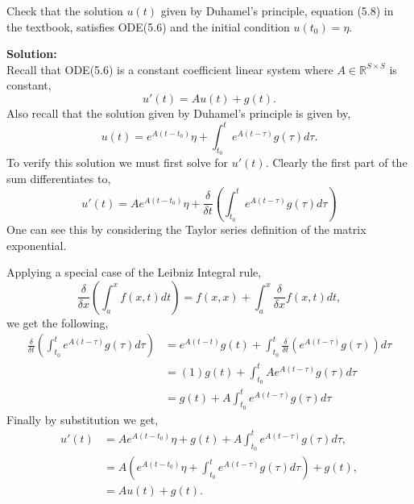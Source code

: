\documentclass[12pt]{article}
\makeatletter
\theoremstyle{homework}
\newenvironment{exercise}[1]
{\def\@currentlabel{#1}\exercisecore}
{\endexercisecore}
\newcommand{\localhead}[1]{\par\smallskip\noindent\textbf{#1}\nobreak\\}%
\newcommand\solution{\localhead{Solution:}}
\newcommand{\Reals}{\ensuremath{\mathbb R}}
\let\RR\Reals
\makeatother
\begin{document}
\vspace{1in}




\begin{exercise}{Problem P24} Check that the solution $u(t)$ given by Duhamel's principle, equation (5.8)
  in the textbook, satisfies ODE(5.6) and the initial condition $u(t_0) = \eta$.
  \solution Recall that ODE(5.6) is a constant coefficient linear system where $A \in \RR^{S \times S}$ 
 is constant,  
  \begin{equation*}
    u'(t) = Au(t) + g(t).
  \end{equation*} 
  Also recall that the solution given by Duhamel's principle is given by, 
  \begin{equation*}
    u(t) = e^{A(t - t_0)}\eta + \int_{t_0}^{t}e^{A(t - \tau)}g(\tau)d\tau.
  \end{equation*}
  To verify this solution we must first solve for $u'(t)$. Clearly the first part of the sum differentiates to, 
  \begin{equation*}
    u'(t) = Ae^{A(t - t_0)}\eta + \frac{\delta}{\delta t}\left(\int_{t_0}^{t}e^{A(t - \tau)}g(\tau)d\tau\right)
  \end{equation*}
  One can see this by considering the Taylor series definition of the matrix exponential. 


  Applying a special case of the Leibniz Integral rule, 
  \begin{equation}
    \frac{\delta}{\delta x} \left(\int_a^x f(x, t) dt \right) = f(x, x) + \int_a^x \frac{\delta}{\delta x} f(x, t) dt,
  \end{equation}
  we get the following, 
  \begin{align*}
    \frac{\delta}{\delta t}\left(\int_{t_0}^{t}e^{A(t - \tau)}g(\tau)d\tau\right)&= e^{A(t - t)}g(t) +  \int_{t_0}^{t} \frac{\delta}{\delta t} \left(e^{A(t - \tau)}g(\tau)\right)d\tau\\
    &= (1)g(t) + \int_{t_0}^{t} Ae^{A(t - \tau)}g(\tau) d\tau\\
    &= g(t) + A \int_{t_0}^{t} e^{A(t - \tau)}g(\tau) d\tau
  \end{align*}
  Finally by substitution we get, 
\begin{align*}
  u'(t) &= Ae^{A(t - t_0)}\eta + g(t) + A \int_{t_0}^{t} e^{A(t - \tau)}g(\tau) d\tau,\\
  &= A\left(e^{A(t - t_0)}\eta + \int_{t_0}^{t} e^{A(t - \tau)}g(\tau) d\tau\right) + g(t),\\
  &= Au(t) + g(t).
\end{align*}
\end{exercise}
\vspace{1in}
\end{document}
